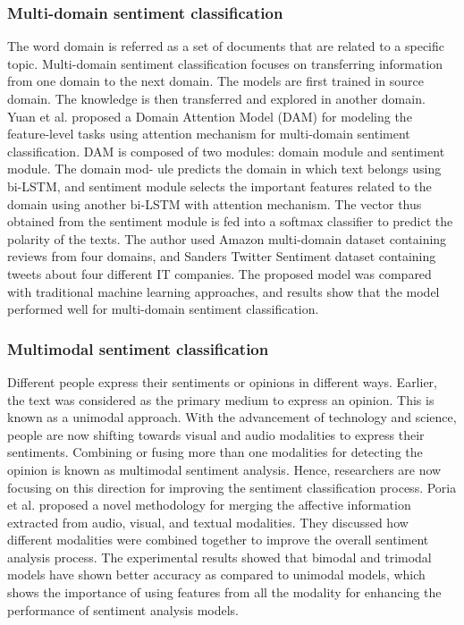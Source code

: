 \subsubsection{Multi-domain sentiment classification}

The word domain is referred as a set of documents that are related to a specific topic. Multi-domain sentiment classification focuses on transferring information from one domain to the next domain. The models are first trained in source domain. The knowledge is then transferred and explored in another domain. Yuan et al.\cite{Yuan_2018} proposed a Domain Attention Model (DAM) for modeling the feature-level tasks using attention mechanism for multi-domain sentiment classification. DAM is composed of two modules: domain module and sentiment module. The domain mod- ule predicts the domain in which text belongs using bi-LSTM, and sentiment module selects the important features related to the domain using another bi-LSTM with attention mechanism. The vector thus obtained from the sentiment module is fed into a softmax classifier to predict the polarity of the texts. The author used Amazon multi-domain dataset containing reviews from four domains, and Sanders Twitter Sentiment dataset containing tweets about four different IT companies. The proposed model was compared with traditional machine learning approaches, and results show that the model performed well for multi-domain sentiment classification.

\subsubsection{Multimodal sentiment classification}

Different people express their sentiments or opinions in different ways. Earlier, the text was considered as the primary medium to express an opinion. This is known as a unimodal approach. With the advancement of technology and science, people are now shifting towards visual and audio modalities to express their sentiments. Combining or fusing more than one modalities for detecting the opinion is known as multimodal sentiment analysis. Hence, researchers are now focusing on this direction for improving the sentiment classification process. Poria et al.\cite{Poria_2016} proposed a novel methodology for merging the affective information extracted from audio, visual, and textual modalities. They discussed how different modalities were combined together to improve the overall sentiment analysis process. The experimental results showed that bimodal and trimodal models
have shown better accuracy as compared to unimodal models, which shows the importance
of using features from all the modality for enhancing the performance of sentiment analysis
models.

